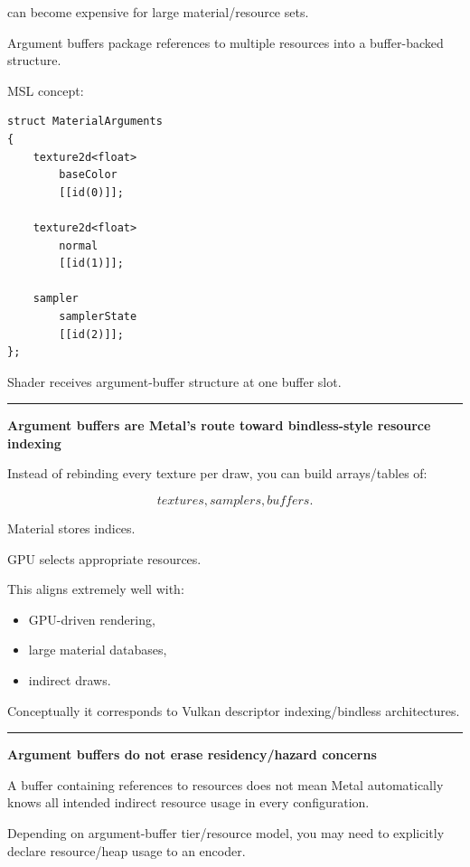 can become expensive for large material/resource sets.

Argument buffers package references to multiple resources into a buffer-backed structure.

MSL concept:

\begin{verbatim}
struct MaterialArguments
{
    texture2d<float>
        baseColor
        [[id(0)]];

    texture2d<float>
        normal
        [[id(1)]];

    sampler
        samplerState
        [[id(2)]];
};
\end{verbatim}

Shader receives argument-buffer structure at one buffer slot.

\begin{center}\rule{0.5\linewidth}{0.5pt}\end{center}

\textbf{Argument buffers are Metal's route toward bindless-style resource indexing}

Instead of rebinding every texture per draw, you can build arrays/tables of:

\[
textures,
samplers,
buffers.
\]

Material stores indices.

GPU selects appropriate resources.

This aligns extremely well with:

\begin{itemize}
\tightlist
\item
  GPU-driven rendering,
\item
  large material databases,
\item
  indirect draws.
\end{itemize}

Conceptually it corresponds to Vulkan descriptor indexing/bindless architectures.

\begin{center}\rule{0.5\linewidth}{0.5pt}\end{center}

\textbf{Argument buffers do not erase residency/hazard concerns}

A buffer containing references to resources does not mean Metal automatically knows all intended indirect resource usage in every configuration.

Depending on argument-buffer tier/resource model, you may need to explicitly declare resource/heap usage to an encoder.


